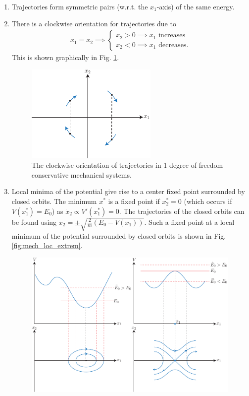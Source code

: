 \begin{enumerate}
	\item Trajectories form symmetric pairs (w.r.t. the $x_1$-axis) of the same energy.
	\item There is a clockwise orientation for trajectories due to 
		\begin{align}
			\dot{x}_1 = x_2 \implies
			\begin{cases}
				x_2>0 \implies x_1  \textrm{ increases} \\
				x_2 <0 \implies x_1  \textrm{ decreases} .
			\end{cases}
		\end{align}
		This is shown graphically in Fig. \ref{fig:mech_clock_orient}.
		\begin{figure}[h!]
			\centering
			\includegraphics[width=0.6\textwidth]{figures/ch4/1mech_clock_orient.pdf}
			\caption{The clockwise orientation of trajectories in 1 degree of freedom conservative mechanical systems.}
			\label{fig:mech_clock_orient}
		\end{figure}
	\item Local minima of the potential give rise to a center fixed point surrounded by closed orbits. The minimum $x^{*} $ is a fixed point if $x^{*}_2 = 0$ (which occurs if $V(x^*_1) = E_0$) as $\dot{x}_2 \propto V'(x^{*}_1) = 0 $. The trajectories of the closed orbits can be found using $x_2 = \pm \sqrt{\frac{2}{m}(E_0 - V(x_1))}$. Such a fixed point at a local minimum of the potential surrounded by closed orbits is shown in Fig. \ref{fig:mech_loc_extrem}.
\begin{figure}[h!]
	\centering
	\includegraphics[width=0.99\textwidth]{figures/ch4/3mech_orbits.pdf}

\end{figure}
\end{enumerate}
